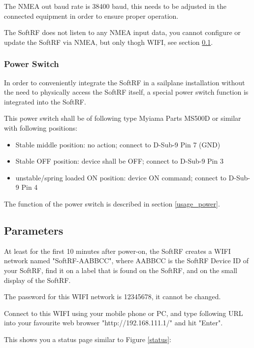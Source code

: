 \documentclass[10pt,a4paper]{article}
\begin{document}
The NMEA out baud rate is 38400 baud, this needs to be adjusted in the connected equipment in order to ensure proper operation.

The SoftRF does not listen to any NMEA input data, you cannot configure or update the SoftRF via NMEA, but only thogh WIFI, see section \ref{parameters}.

\subsubsection{Power Switch}
In order to conveniently integrate the SoftRF in a sailplane installation without the need to physically access the SoftRF itself, a special power switch function is integrated into the SoftRF. 

This power switch shall be of following type Myiama Parts MS500D or similar with following positions:
\begin{itemize}
\item Stable middle position: no action; connect to D-Sub-9 Pin 7 (GND)
\item Stable OFF position: device shall be OFF; connect to D-Sub-9 Pin 3
\item unstable/spring loaded ON position: device ON command; connect to D-Sub-9 Pin 4
\end{itemize}

The function of the power switch is described in section \ref{usage_power}.

\subsection{Parameters}\label{parameters}
At least for the first 10 minutes after power-on, the SoftRF creates a WIFI network named "SoftRF-AABBCC", where AABBCC is the SoftRF Device ID of your SoftRF, find it on a label that is found on the SoftRF, and on the small display of the SoftRF.

The password for this WIFI network is 12345678, it cannot be changed.

Connect to this WIFI using your mobile phone or PC, and type following URL into your favourite web browser "http://192.168.111.1/" and hit "Enter".

This shows you a status page similar to Figure \ref{status}:
\end{document}
